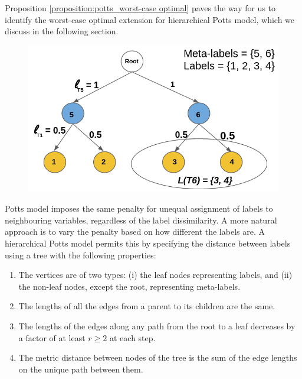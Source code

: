 Proposition \ref{proposition:potts_worst-case optimal} paves the way for us to
identify the worst-case optimal extension for hierarchical Potts model, which
we discuss in the following section.

\label{sec:rhst_worst-case optimal}

\begin{figure}
\centering
\includegraphics[scale = 0.30]{./figures/rhst_notation.png}
\label{fig:rhst}
\end{figure}
Potts model imposes the same penalty for unequal assignment of labels to neighbouring variables, regardless of the label dissimilarity. A more natural approach is to vary the penalty based on how different the labels are. A hierarchical Potts model permits this by specifying the distance between labels using a tree with the following properties:
\vspace{2mm}
\begin{enumerate}
  \itemsep+1em 
\item The vertices are of two types: (i) the leaf nodes representing labels, and (ii) the non-leaf nodes, except the root, representing meta-labels.
\item The lengths of all the edges from a parent to its children are the same.
\item The lengths of the edges along any path from the root to a leaf decreases by a factor of at least $r \geq 2$ at each step.
\item The metric distance between nodes of the tree is the sum of the edge lengths on the unique path between them. 
\end{enumerate}

